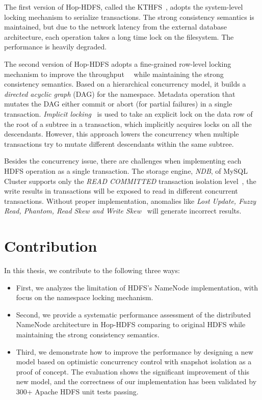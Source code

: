 \noindent The first version of Hop-HDFS, called the KTHFS~\cite{wasif2012distributed}, adopts the system-level locking mechanism to serialize transactions. The strong consistency semantics is maintained, but due to the network latency from the external database architecture, each operation takes a long time lock on the filesystem. The performance is heavily degraded.

\noindent The second version of Hop-HDFS adopts a fine-grained row-level locking mechanism to improve the throughput~\cite{hakimzadeh2014scaling}~\cite{peiro2013maintaining} while maintaining the strong consistency semantics. Based on a hierarchical concurrency model, it builds a \textit{directed acyclic graph} (DAG) for the namespace. Metadata operation that mutates the DAG either commit or abort (for partial failures) in a single transaction. \textit{Implicit locking}~\cite{gray1976granularity} is used to take an explicit lock on the data row of the root of a subtree in a transaction, which implicitly acquires locks on all the descendants. However, this approach lowers the concurrency when multiple transactions try to mutate different descendants within the same subtree.

\noindent Besides the concurrency issue, there are challenges when implementing each HDFS operation as a single transaction. The storage engine, \textit{NDB}, of MySQL Cluster supports only the \textit{READ COMMITTED} transaction isolation level~\cite{ndblimits}, the write results in transactions will be exposed to read in different concurrent transactions. Without proper implementation, anomalies like \textit{Lost Update, Fuzzy Read, Phantom, Read Skew and Write Skew}~\cite{berenson1995critique} will generate incorrect results.


\section{Contribution}

In this thesis, we contribute to the following three ways:

\begin{itemize}
	\item First, we analyzes the limitation of HDFS's NameNode implementation, with focus on the namespace locking mechanism.
	\item Second, we provide a systematic performance assessment of the distributed NameNode architecture in Hop-HDFS comparing to original HDFS while maintaining the strong consistency semantics.
	\item Third, we demonstrate how to improve the performance by designing a new model based on optimistic concurrency control with snapshot isolation as a proof of concept. The evaluation shows the significant improvement of this new model, and the correctness of our implementation has been validated by 300+ Apache HDFS unit tests passing.
\end{itemize}

